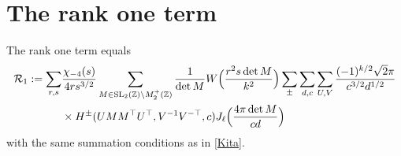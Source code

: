 \documentclass[11pt]{amsart}
\numberwithin{equation}{section}
\theoremstyle{plain}
\theoremstyle{definition}
\numberwithin{equation}{section}
\begin{document}
\section{The rank one term}\label{rank1}


The rank one term equals
\begin{align}
\mathcal{R}_1 :=  \sum_{r, s} &\frac{\chi_{-4}(s)}{4rs^{3/2}} \sum_{M \in {\rm SL}_2(\mathbb{Z}) \backslash M_2^+(\mathbb{Z})} \frac{1}{\det M} W\Big( \frac{r^2 s \det M}{k^2}\Big) \sum_{\pm} \sum_{d, c} \sum_{U, V} \frac{(-1)^{k/2}\sqrt{2}\pi}{c^{3/2} d^{1/2}} \\
 &\times H^{\pm} (U MM^{\top} U^{\top}, V^{-1}V^{-\top}, c) J_{\ell} \Big(\frac{4\pi \det M}{cd}\Big)
 \end{align}
with the same summation conditions as in \eqref{Kita}. 
\end{document}
